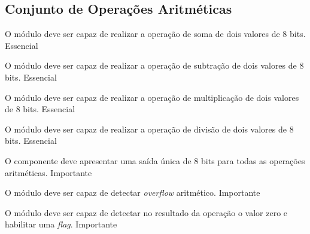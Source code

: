   \subsection{Conjunto de Operações Aritméticas} 
  
    \begin{functional}
      {O módulo deve ser capaz de realizar a operação de soma de dois valores de 8 bits.}
      {Essencial}

      {O módulo deve ser capaz de realizar a operação de subtração de dois valores de 8 bits.}
      {Essencial}

      {O módulo deve ser capaz de realizar a operação de multiplicação de dois valores de 8 bits. }
      {Essencial}

      {O módulo deve ser capaz de realizar a operação de divisão de dois valores de 8 bits.}
      {Essencial} 

      {O componente deve apresentar uma saída única de 8 bits para todas as operações aritméticas.}
      {Importante}       

      {O módulo deve ser capaz de detectar \textit{overflow} aritmético.}
      {Importante}
      
      {O módulo deve ser capaz de detectar no resultado da operação o valor zero e habilitar uma \textit{flag}.}
      {Importante}
      
    \end{functional}